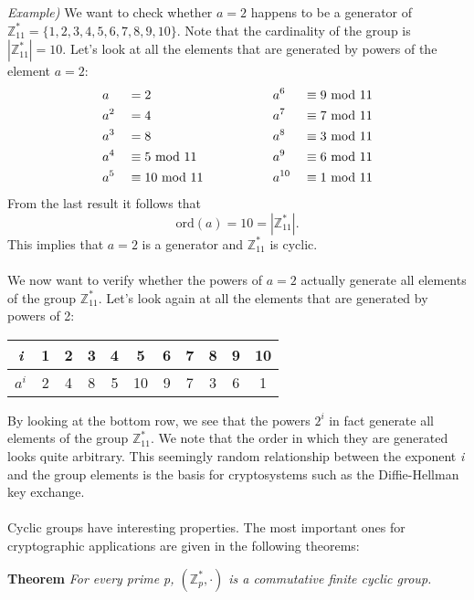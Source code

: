 \newpage
\hfill\break
\textit{Example)} We want to check whether $a=2$ happens to be a generator of $\mathbb{Z}_{11}^*=\{1,2,3,4,5,6,7,8,9,10\}$. Note that the cardinality of the group is $|\mathbb{Z}_{11}^*|=10$. Let's look at all the elements that are generated by powers of the element $a=2$:
\begin{alignat*}{4}
    &a &&=2\hspace{3cm}&&a^6&&\equiv9\mymod11\\
    &a^2 &&=4 &&a^7&&\equiv7\mymod11\\
    &a^3 &&=8 &&a^8&&\equiv3\mymod11\\
    &a^4 &&\equiv5\mymod11 &&a^9&&\equiv6\mymod11\\
    &a^5 &&\equiv10\mymod11 &&a^{10}&&\equiv1\mymod11
\end{alignat*}
From the last result it follows that
$$\text{ord}(a)=10=|\mathbb{Z}_{11}^*|.$$
This implies that $a=2$ is a generator and $\mathbb{Z}_{11}^*$ is cyclic.\\\\
We now want to verify whether the powers of $a=2$ actually generate all elements of the group $\mathbb{Z}_{11}^*$. Let's look again at all the elements that are generated by powers of 2:
\begin{center}
    \begin{tabular}{c|cccccccccc}
        \textit{i}&1&2&3&4&5&6&7&8&9&10\\
        \hline
        $a^i$&2&4&8&5&10&9&7&3&6&1 
    \end{tabular}
\end{center}
By looking at the bottom row, we see that the powers $2^i$ in fact generate all elements of the group $\mathbb{Z}_{11}^*$. We note that the order in which they are generated looks quite arbitrary. This seemingly random relationship between the exponent \textit{i} and the group elements is the basis for cryptosystems such as the Diffie-Hellman key exchange.\\\\
Cyclic groups have interesting properties. The most important ones for cryptographic applications are given in the following theorems:
\begin{center}
    \begin{framed}
        \textbf{Theorem} \textit{For every prime p, $(\mathbb{Z}_p^*,\cdot)$ is a commutative finite cyclic group.}
    \end{framed}
\end{center}

